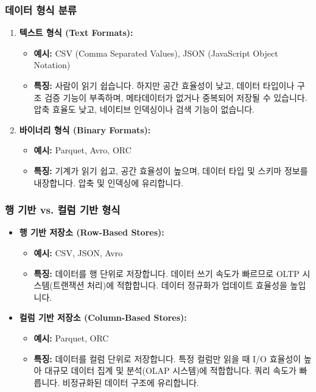 \documentclass[11pt,a4paper]{article}
\theoremstyle{definition}
\begin{document}
\subsubsection{데이터 형식 분류}
\begin{enumerate}
    \item \textbf{텍스트 형식 (Text Formats):}
    \begin{itemize}
        \item \textbf{예시:} CSV (Comma Separated Values), JSON (JavaScript Object Notation)
        \item \textbf{특징:} 사람이 읽기 쉽습니다. 하지만 공간 효율성이 낮고, 데이터 타입이나 구조 검증 기능이 부족하며, 메타데이터가 없거나 중복되어 저장될 수 있습니다. 압축 효율도 낮고, 네이티브 인덱싱이나 검색 기능이 없습니다.
    \end{itemize}

    \item \textbf{바이너리 형식 (Binary Formats):}
    \begin{itemize}
        \item \textbf{예시:} Parquet, Avro, ORC
        \item \textbf{특징:} 기계가 읽기 쉽고, 공간 효율성이 높으며, 데이터 타입 및 스키마 정보를 내장합니다. 압축 및 인덱싱에 유리합니다.
    \end{itemize}
\end{enumerate}

\subsubsection{행 기반 vs. 컬럼 기반 형식}
\begin{itemize}
    \item \textbf{행 기반 저장소 (Row-Based Stores):}
    \begin{itemize}
        \item \textbf{예시:} CSV, JSON, Avro
        \item \textbf{특징:} 데이터를 행 단위로 저장합니다. 데이터 쓰기 속도가 빠르므로 OLTP 시스템(트랜잭션 처리)에 적합합니다. 데이터 정규화가 업데이트 효율성을 높입니다.
    \end{itemize}

    \item \textbf{컬럼 기반 저장소 (Column-Based Stores):}
    \begin{itemize}
        \item \textbf{예시:} Parquet, ORC
        \item \textbf{특징:} 데이터를 컬럼 단위로 저장합니다. 특정 컬럼만 읽을 때 I/O 효율성이 높아 대규모 데이터 집계 및 분석(OLAP 시스템)에 적합합니다. 쿼리 속도가 빠릅니다. 비정규화된 데이터 구조에 유리합니다.
    \end{itemize}
\end{itemize}
\end{document}
